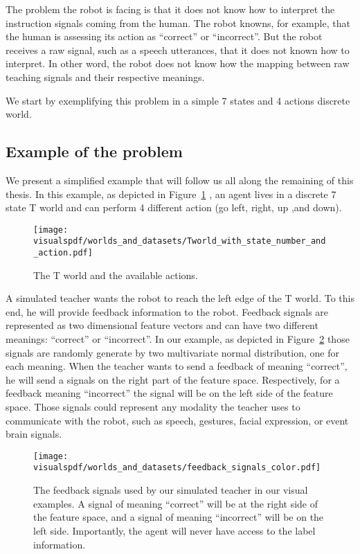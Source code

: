 The problem the robot is facing is that it does not know how to interpret the instruction signals coming from the human. The robot knowns, for example, that the human is assessing its action as ``correct'' or ``incorrect''. But the robot receives a raw signal, such as a speech utterances, that it does not known how to interpret. In other word, the robot does not know how the mapping between raw teaching signals and their respective meanings.

We start by exemplifying this problem in a simple 7 states and 4 actions discrete world.

\subsection{Example of the problem}
\label{chapter:lfui:example}

We present a simplified example that will follow us all along the remaining of this thesis. In this example, as depicted in Figure~\ref{fig:Tworld} , an agent lives in a discrete 7 state T world and can perform 4 different action (go left, right, up ,and down).

\begin{figure}[!ht]
  \centering
  \texttt{[image: \\visualspdf/worlds\_and\_datasets/Tworld\_with\_state\_number\_and\_action.pdf]}
  \caption{The T world and the available actions.}
  \label{fig:Tworld}
\end{figure}

A simulated teacher wants the robot to reach the left edge of the T world. To this end, he will provide feedback information to the robot. Feedback signals are represented as two dimensional feature vectors and can have two different meanings: ``correct'' or ``incorrect''. In our example, as depicted in Figure~\ref{fig:feedbacksignals} those signals are randomly generate by two multivariate normal distribution, one for each meaning. When the teacher wants to send a feedback of meaning ``correct'', he will send a signals on the right part of the feature space. Respectively, for a feedback meaning ``incorrect'' the signal will be on the left side of the feature space. Those signals could represent any modality the teacher uses to communicate with the robot, such as speech, gestures, facial expression, or event brain signals. 

\begin{figure}[!ht]
  \centering
  \texttt{[image: \\visualspdf/worlds\_and\_datasets/feedback\_signals\_color.pdf]}
  \caption{The feedback signals used by our simulated teacher in our visual examples. A signal of meaning ``correct'' will be at the right side of the feature space, and a signal of meaning ``incorrect'' will be on the left side. Importantly, the agent will never have access to the label information.}
  \label{fig:feedbacksignals}
\end{figure}

